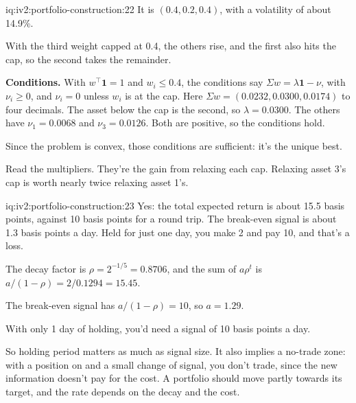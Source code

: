 \begin{solution}{iq:iv2:portfolio-construction:22}
It is $(0.4, 0.2, 0.4)$, with a volatility of about 14.9\%.

With the third weight capped at 0.4, the others rise, and the first also hits the cap, so the second takes the remainder.

\textbf{Conditions.} With $w^\top\mathbf{1} = 1$ and $w_i \le 0.4$, the conditions say $\Sigma w = \lambda\mathbf{1} - \nu$, with $\nu_i \ge 0$, and $\nu_i = 0$ unless $w_i$ is at the cap. Here $\Sigma w = (0.0232, 0.0300, 0.0174)$ to four decimals. The asset below the cap is the second, so $\lambda = 0.0300$. The others have $\nu_1 = 0.0068$ and $\nu_3 = 0.0126$. Both are positive, so the conditions hold.

Since the problem is convex, those conditions are sufficient: it's the unique best.

Read the multipliers. They're the gain from relaxing each cap. Relaxing asset 3's cap is worth nearly twice relaxing asset 1's.

\end{solution}

\begin{solution}{iq:iv2:portfolio-construction:23}
Yes: the total expected return is about 15.5 basis points, against 10 basis points for a round trip. The break-even signal is about 1.3 basis points a day. Held for just one day, you make 2 and pay 10, and that's a loss.

The decay factor is $\rho = 2^{-1/5} = 0.8706$, and the sum of $a\rho^t$ is $a/(1 - \rho) = 2/0.1294 = 15.45$.

The break-even signal has $a/(1 - \rho) = 10$, so $a = 1.29$.

With only 1 day of holding, you'd need a signal of 10 basis points a day.

So holding period matters as much as signal size. It also implies a no-trade zone: with a position on and a small change of signal, you don't trade, since the new information doesn't pay for the cost. A portfolio should move partly towards its target, and the rate depends on the decay and the cost.

\end{solution}

